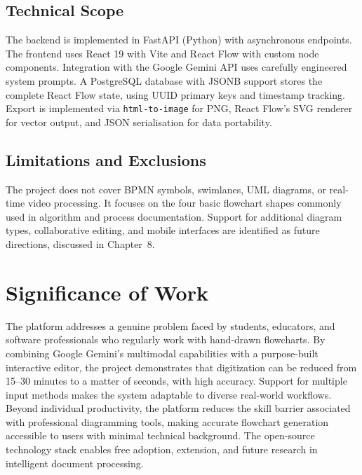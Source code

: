 \subsection{Technical Scope}
 
The backend is implemented in FastAPI (Python) with asynchronous endpoints. The frontend uses React 19 with Vite and React Flow with custom node components. Integration with the Google Gemini API uses carefully engineered system prompts. A PostgreSQL database with JSONB support stores the complete React Flow state, using UUID primary keys and timestamp tracking. Export is implemented via \texttt{html-to-image} for PNG, React Flow's SVG renderer for vector output, and JSON serialisation for data portability.
 
\subsection{Limitations and Exclusions}
 
The project does not cover BPMN symbols, swimlanes, UML diagrams, or real-time video processing. It focuses on the four basic flowchart shapes commonly used in algorithm and process documentation. Support for additional diagram types, collaborative editing, and mobile interfaces are identified as future directions, discussed in Chapter~8.
 
\section{Significance of Work}
\label{sec:significance}
 
The platform addresses a genuine problem faced by students, educators, and software professionals who regularly work with hand-drawn flowcharts. By combining Google Gemini's multimodal capabilities with a purpose-built interactive editor, the project demonstrates that digitization can be reduced from 15–30 minutes to a matter of seconds, with high accuracy. Support for multiple input methods makes the system adaptable to diverse real-world workflows. Beyond individual productivity, the platform reduces the skill barrier associated with professional diagramming tools, making accurate flowchart generation accessible to users with minimal technical background. The open-source technology stack enables free adoption, extension, and future research in intelligent document processing.